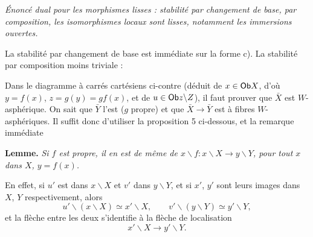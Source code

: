 \textit{Énoncé dual pour les morphismes lisses : stabilité par changement de base, par composition, les isomorphismes locaux sont lisses, notamment les immersions ouvertes.}

La stabilité par changement de base est immédiate sur la forme c). La stabilité par composition moins triviale :

\begin{center}
\end{center}

Dans le diagramme à carrés cartésiens ci-contre (déduit de $x \in \mathsf{Ob} X$, d'où $y = f(x)$, $z = g(y) = gf(x)$, et de $u \in \mathsf{Ob} z\backslash Z$), il faut prouver que $\bar{X}$ est $W$-asphérique. On sait que $\bar{Y}$ l'est ($g$ propre) et que $\bar{X} \longrightarrow \bar{Y}$ est à fibres $W$-asphériques. Il suffit donc d'utiliser la proposition 5 ci-dessous, et la remarque immédiate %

\textbf{Lemme.} \textit{Si $f$ est propre, il en est de même de $x\backslash f : x\backslash X \longrightarrow y\backslash Y$, pour tout $x$ dans $X$, $y = f(x)$.}

En effet, si $u'$ est dans $x\backslash X$ et $v'$ dans $y\backslash Y$, et si $x'$, $y'$ sont leurs images dans $X$, $Y$ respectivement, alors
\[
u'\backslash(x\backslash X)\simeq x'\backslash X,\qquad v'\backslash(y\backslash Y)\simeq y'\backslash Y,
\]
et la flèche entre les deux s'identifie à la flèche de localisation
\[
x'\backslash X\longrightarrow y'\backslash Y.
\]

